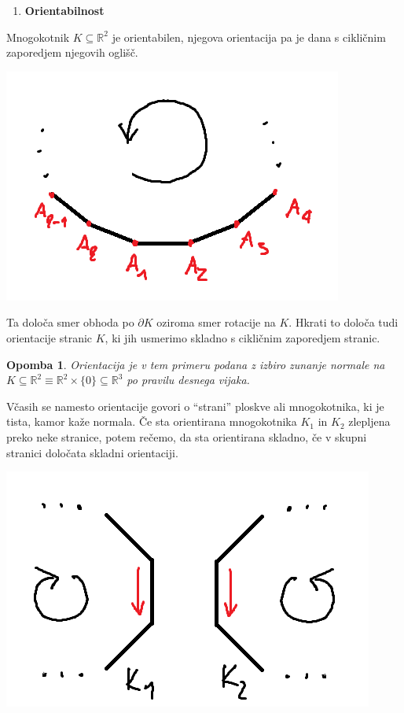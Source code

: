 \documentclass[10pt, a4paper]{article}
\newtheorem*{opomba}{Opomba}
\newcommand{\R}{\mathbb {R}}
\begin{document}
\begin{enumerate}
  \item \textbf{Orientabilnost}
\end{enumerate}

Mnogokotnik $K \subseteq \R^2$ je orientabilen,
njegova orientacija pa je dana s cikličnim zaporedjem njegovih oglišč.
\begin{center}
  \includegraphics[scale=0.8]{orientabilnost1.png}
\end{center}
Ta določa smer obhoda po $\partial K$ oziroma smer rotacije na $K$.
Hkrati to določa tudi orientacije stranic $K$, ki jih usmerimo skladno s cikličnim 
zaporedjem stranic.

\begin{opomba}
  Orientacija je v tem primeru podana z izbiro zunanje normale 
  na $K \subseteq \R^2 \equiv \R^2 \times \{0\} \subseteq \R^3$
  po pravilu desnega vijaka.
\end{opomba}

Včasih se namesto orientacije govori o "`strani"'
ploskve ali mnogokotnika, ki je tista, kamor kaže normala.
Če sta orientirana mnogokotnika $K_1$ in $K_2$
zlepljena preko neke stranice, potem rečemo, da sta orientirana skladno,
če v skupni stranici določata skladni orientaciji.

\begin{center}
  \includegraphics[scale=0.75]{orientabilnost2.png}
\end{center}
\end{document}
